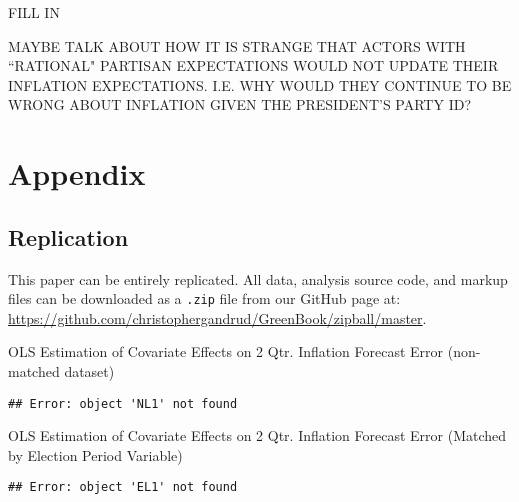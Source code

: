 \documentclass[a4paper]{article}\usepackage{graphicx, color}
\makeatletter
\newenvironment{kframe}{%
 \def\FrameCommand##1{\hskip\@totalleftmargin \hskip-\fboxsep
 \colorbox{shadecolor}{##1}\hskip-\fboxsep
     \hskip-\linewidth \hskip-\@totalleftmargin \hskip\columnwidth}%
 \MakeFramed {\advance\hsize-\width
   \@totalleftmargin\z@ \linewidth\hsize
   \@setminipage}}%
 {\par\unskip\endMakeFramed}
\makeatother
\begin{document}
FILL IN

MAYBE TALK ABOUT HOW IT IS STRANGE THAT ACTORS WITH ``RATIONAL" PARTISAN EXPECTATIONS WOULD NOT UPDATE THEIR INFLATION EXPECTATIONS. I.E. WHY WOULD THEY CONTINUE TO BE WRONG ABOUT INFLATION GIVEN THE PRESIDENT'S PARTY ID?

\clearpage
\section*{Appendix}

\subsection*{Replication}

This paper can be entirely replicated. All data, analysis source code, and markup files can be downloaded as a {\tt{.zip}} file from our GitHub page at: {\url{https://github.com/christophergandrud/GreenBook/zipball/master}}.


\begin{table}[ht]
    \caption{OLS Estimation of Covariate Effects on 2 Qtr. Inflation Forecast Error (non-matched dataset)}
    \label{OutputNL}
    \vspace{0.25cm}
    \begin{center}
    {\footnotesize
\begin{kframe}
\begin{verbatim}
## Error: object 'NL1' not found
\end{verbatim}
\end{kframe}

    }
    \end{center}
\end{table}


\begin{table}[ht]
    \caption{OLS Estimation of Covariate Effects on 2 Qtr. Inflation Forecast Error (Matched by Election Period Variable)}
    \label{OutputEL}
    \vspace{0.25cm}
    \begin{center}
    {\footnotesize
\begin{kframe}
\begin{verbatim}
## Error: object 'EL1' not found
\end{verbatim}
\end{kframe}

    }
    \end{center}
\end{table}
\end{document}
